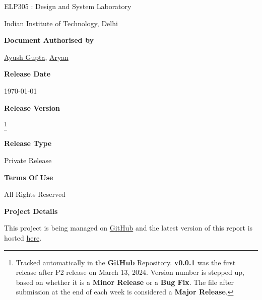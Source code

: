 \begin{titlepage}
{				\par
            }
            \vskip0.15in
             {
				\fontsize{16}{16}
				\sffamily
                ELP305 : Design and System Laboratory
				\par
            }
            \vskip0.15in
             {
				\fontsize{16}{14}
				\sffamily
                Indian Institute of Technology, Delhi	
                \par
            }
    \vspace{1.0in}
    {
        \normalsize
        \sffamily
        \textbf{\textcolor{tuberlindarkgray}{Document Authorised by}}\par \vspace{0.125cm}
        {\href{https://www.linkedin.com/in/ayush-gupta-undergraduate/}{Ayush Gupta}, \href{www.linkedin.com}{Aryan}}

        \vspace{0.25cm}
        \textbf{\textcolor{tuberlindarkgray}{Release Date}}\par \vspace{0.125cm}
        {\today}

        \vspace{0.25cm}
        \textbf{\textcolor{tuberlindarkgray}{Release Version}}\par \vspace{0.125cm}
        \textbf{}\footnote{Tracked automatically in the \textbf{GitHub} Repository.
                  \textbf{v0.0.1} was the first release after P2 release on March 13, 2024.
                  Version number is stepped up, based on whether it is a \textbf{Minor Release} or a \textbf{Bug Fix}.
                  The file after submission at the end of each week is considered a \textbf{Major Release}.}

        \vspace{0.25cm}
        \textbf{\textcolor{tuberlindarkgray}{Release Type}}\par \vspace{0.125cm}
        {Private Release}

        \vspace{0.25cm}
        \textbf{\textcolor{tuberlindarkgray}{Terms Of Use}}\par \vspace{0.125cm}
        {All Rights Reserved}

        \vspace{0.25cm}
        \textbf{\textcolor{tuberlindarkgray}{Project Details}}\par \vspace{0.125cm}
        {This project is being managed on \href{https://github.com/ELP305-Cleaning-Machine}{GitHub} and the latest version of this report is hosted \href{https://2nav.github.io/TribeC/}{here}.}
    }
\end{titlepage}
\afterpage{\restoregeometry}    
